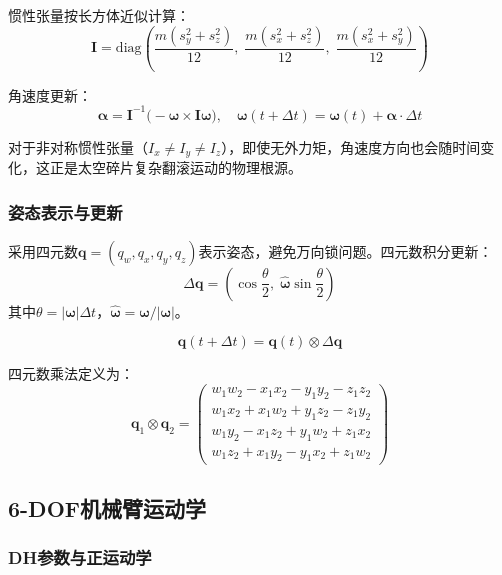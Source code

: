 \documentclass[12pt,a4paper]{ctexart}
\begin{document}
惯性张量按长方体近似计算：
\begin{equation}
  \mathbf{I} = \mathrm{diag}\!\left(\frac{m(s_y^2+s_z^2)}{12},\; \frac{m(s_x^2+s_z^2)}{12},\; \frac{m(s_x^2+s_y^2)}{12}\right)
\end{equation}

角速度更新：
\begin{equation}
  \boldsymbol{\alpha} = \mathbf{I}^{-1}\bigl(-\boldsymbol{\omega} \times \mathbf{I}\boldsymbol{\omega}\bigr), \quad
  \boldsymbol{\omega}(t+\Delta t) = \boldsymbol{\omega}(t) + \boldsymbol{\alpha} \cdot \Delta t
\end{equation}

对于非对称惯性张量（$I_x \neq I_y \neq I_z$），即使无外力矩，角速度方向也会随时间变化，这正是太空碎片复杂翻滚运动的物理根源。

\subsubsection{姿态表示与更新}

采用四元数$\mathbf{q} = (q_w, q_x, q_y, q_z)$表示姿态，避免万向锁问题。四元数积分更新：
\begin{equation}
  \Delta\mathbf{q} = \left(\cos\frac{\theta}{2},\; \hat{\boldsymbol{\omega}}\sin\frac{\theta}{2}\right)
\end{equation}
其中$\theta = |\boldsymbol{\omega}|\Delta t$，$\hat{\boldsymbol{\omega}} = \boldsymbol{\omega}/|\boldsymbol{\omega}|$。

\begin{equation}
  \mathbf{q}(t+\Delta t) = \mathbf{q}(t) \otimes \Delta\mathbf{q}
\end{equation}

四元数乘法定义为：
\begin{equation}
  \mathbf{q}_1 \otimes \mathbf{q}_2 = \begin{pmatrix} w_1w_2 - x_1x_2 - y_1y_2 - z_1z_2 \\ w_1x_2 + x_1w_2 + y_1z_2 - z_1y_2 \\ w_1y_2 - x_1z_2 + y_1w_2 + z_1x_2 \\ w_1z_2 + x_1y_2 - y_1x_2 + z_1w_2 \end{pmatrix}
\end{equation}


\subsection{6-DOF机械臂运动学}

\subsubsection{DH参数与正运动学}
\end{document}
